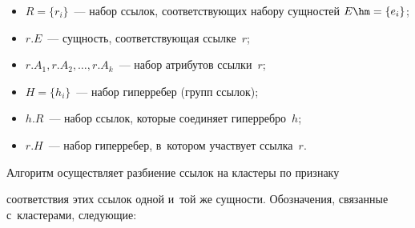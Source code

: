   \begin{itemize}


\item $R = \{r_i\}$~--- набор ссылок, соответствующих набору сущностей $E\hm = 


\{e_i\}$;


\item 


$r.E$~--- сущность, соответствующая ссылке~$r$;


\item 


$r.A_1, r.A_2, \ldots , r.A_k$~--- набор атрибутов ссылки~$r$;


\item 


$H = \{h_i\}$~--- набор гиперребер (групп ссылок);


\item 


$h.R$~--- набор ссылок, которые соединяет гиперребро~$h$;


\item 


$r.H$~--- набор гиперребер, в~котором участвует ссылка~$r$.


\end{itemize}


  


  Алгоритм осуществляет разбиение ссылок на клас\-те\-ры по признаку 


соответствия этих ссылок одной и~той же сущности. Обозначения, связанные с~клас\-те\-ра\-ми, сле\-ду\-ющие:


